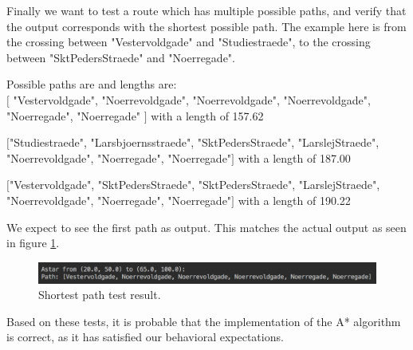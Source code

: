 Finally we want to test a route which has multiple possible paths, and verify that the output corresponds with the shortest possible path. The example here is from the crossing between "Vestervoldgade" and "Studiestraede", to the crossing between "SktPedersStraede" and "Noerregade".

Possible paths are and lengths are: \\
 $[$ "Vestervoldgade", "Noerrevoldgade", "Noerrevoldgade", "Noerrevoldgade", "Noerregade", "Noerregade" $]$
with a length of 157.62

$[$"Studiestraede", "Larsbjoernsstraede", "SktPedersStraede", "LarslejStraede", "Noerrevoldgade", "Noerregade", "Noerregade"$]$ 
with a length of 187.00

$[$"Vestervoldgade", "SktPedersStraede", "SktPedersStraede", "LarslejStraede", "Noerrevoldgade", "Noerregade", "Noerregade"$]$
with a length of 190.22

We expect to see the first path as output. This matches the actual output as seen in figure \ref{fig:test3}.

\begin{figure}[H]
    \centering
    \includegraphics[width = 0.9\linewidth]{RouteFinding/RFtest3.png}
    \caption{Shortest path test result.}
    \label{fig:test3}
\end{figure}

Based on these tests, it is probable that the implementation of the A* algorithm is correct, as it has satisfied our behavioral expectations.